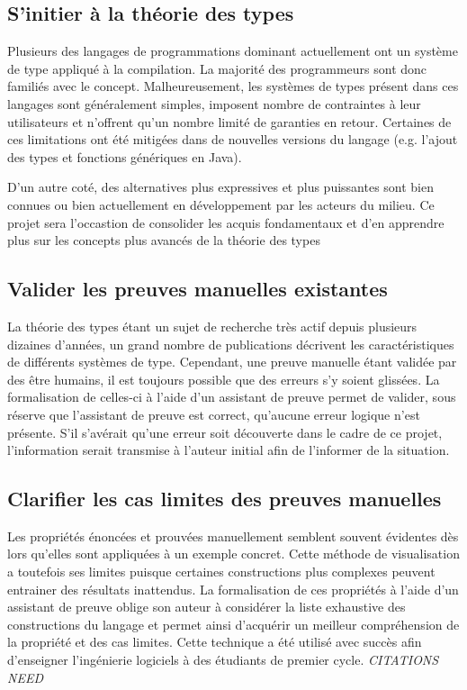 \documentclass[a4paper, oneside, 12pt, titlepage, draft]{article}
\begin{document}
\subsection{S'initier à la théorie des types}

Plusieurs des langages de programmations dominant actuellement ont un système de type appliqué à la
compilation. La majorité des programmeurs sont donc familiés avec le concept. Malheureusement, les
systèmes de types présent dans ces langages sont généralement simples, imposent nombre de
contraintes à leur utilisateurs et n'offrent qu'un nombre limité de garanties en retour. Certaines
de ces limitations ont été mitigées dans de nouvelles versions du langage (e.g. l'ajout des types et
fonctions génériques en Java).

D'un autre coté, des alternatives plus expressives et plus puissantes sont bien connues ou bien
actuellement en développement par les acteurs du milieu. Ce projet sera l'occastion de consolider
les acquis fondamentaux et d'en apprendre plus sur les concepts plus avancés de la théorie des types

\subsection{Valider les preuves manuelles existantes}

La théorie des types étant un sujet de recherche très actif depuis plusieurs dizaines d'années, un
grand nombre de publications décrivent les caractéristiques de différents systèmes de type.
Cependant, une preuve manuelle étant validée par des être humains, il est toujours possible que des
erreurs s'y soient glissées. La formalisation de celles-ci à l'aide d'un assistant de preuve permet
de valider, sous réserve que l'assistant de preuve est correct, qu'aucune erreur logique n'est
présente. S'il s'avérait qu'une erreur soit découverte dans le cadre de ce projet, l'information
serait transmise à l'auteur initial afin de l'informer de la situation.

\subsection{Clarifier les cas limites des preuves manuelles}

Les propriétés énoncées et prouvées manuellement semblent souvent évidentes dès lors qu'elles sont
appliquées à un exemple concret. Cette méthode de visualisation a toutefois ses limites puisque
certaines constructions plus complexes peuvent entrainer des résultats inattendus. La formalisation
de ces propriétés à l'aide d'un assistant de preuve oblige son auteur à considérer la liste
exhaustive des constructions du langage et permet ainsi d'acquérir un meilleur compréhension de la
propriété et des cas limites. Cette technique a été utilisé avec succès afin d'enseigner
l'ingénierie logiciels à des étudiants de premier cycle. \emph{CITATIONS NEED}
\end{document}

